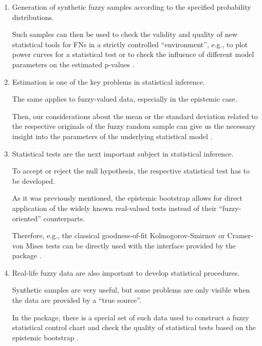 \begin{enumerate}

	\item Generation of synthetic fuzzy samples according to the specified probability distributions.
	
	Such samples can then be used to check the validity and quality of new statistical tools for FNs in a strictly controlled ``environment'', e.g., to plot power curves for a statistical test \citep{pgmr2022} or to check the influence of different model parameters on the estimated p-values \citep{PGMR2024AMS}.

	\item Estimation is one of the key problems in statistical inference.
	
	The same applies to fuzzy-valued data, especially in the epistemic case.
	
	Then, our considerations about the mean or the standard deviation related to the respective originals of the fuzzy random sample can give us the necessary insight into the parameters of the underlying statistical model \citep{grzegorzewski2021,pgmr2022}.

	\item Statistical tests are the next important subject in statistical inference.
	
	To accept or reject the null hypothesis, the respective statistical test has to be developed.
	
	As it was previously mentioned, the epistemic bootstrap allows for direct application of the widely known real-valued tests instead of their ``fuzzy-oriented'' counterparts.
	
	Therefore, e.g., the classical goodness-of-fit Kolmogorov-Smirnov or Cramer-von Mises tests can be directly used with the interface provided by the  package \citep{10.1007/978-3-031-08974-9_39,PGMR2024AMS}.

	\item Real-life fuzzy data are also important to develop statistical procedures.
	
	Synthetic samples are very useful, but some problems are only visible when the data are provided by a ``true source''.
	
	In the  package, there is a special set of such data used to construct a fuzzy statistical control chart \citep{FARAZ20102684} and check the quality of statistical tests based on the epistemic bootstrap \citep{PGMR2024AMS}.

\end{enumerate}


